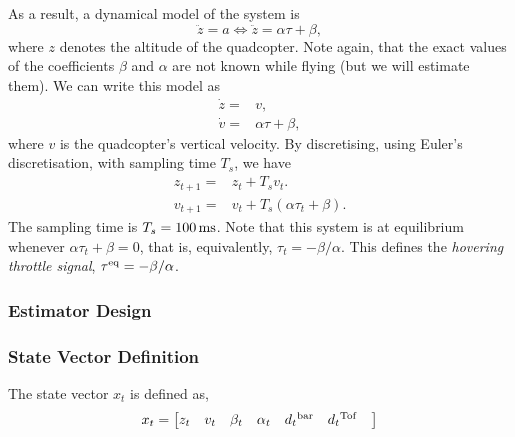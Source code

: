\documentclass{report}
\begin{document}
  As a result, a dynamical model of the system is
  \begin{equation}
    \ddot{z} {}={} a \Leftrightarrow \ddot{z} {}={} \alpha \tau + \beta,
  \end{equation}
  where $z$ denotes the altitude of the quadcopter. Note again, that the exact
  values of the coefficients $\beta$ and $\alpha$ are not known while flying
  (but we will estimate them). We can write this model as
  \begin{subequations}
    \begin{align}
      \dot{z} {}={} & v,
      \\
      \dot{v} {}={} & \alpha \tau + \beta,
    \end{align}
  \end{subequations}
  where $v$ is the quadcopter's vertical velocity. By discretising, using
  Euler's discretisation, with sampling time $T_s$, we have
  \begin{subequations}\label{eq:basic-mdl}
    \begin{align}
      z_{t+1} {}={} & z_t + T_s v_t.
      \\
      v_{t+1} {}={} & v_t + T_s(\alpha \tau_t + \beta).
    \end{align}
  \end{subequations}
  The sampling time is $T_s = \unit[100]{ms}$. Note that this system is at
  equilibrium whenever $\alpha \tau_t + \beta = 0$, that is, equivalently,
  $\tau_t = -\beta / \alpha$. This defines the \textit{hovering throttle
  signal}, $\tau^{\rm eq} = -\beta / \alpha$.


    \subsubsection*{Estimator Design}\label{estimator_design}
    \subsubsection*{State Vector Definition}
    The state vector \( x_t \) is defined as,
    \begin{equation}
        x_t = 
        \begin{bmatrix}
            z_t &
            v_{t} & 
            \beta_t & 
            \alpha_t &
            d{_t}^{\rm bar}&
            d{_t}^{\rm Tof}&
        \end{bmatrix}
        \label{stateVectorXt}
    \end{equation}
\end{document}

